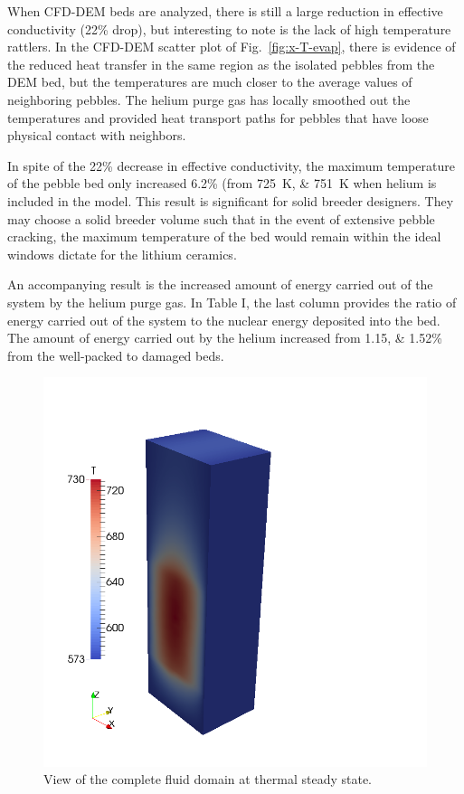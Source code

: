 When CFD-DEM beds are analyzed, there is still a large reduction in effective conductivity (22\% drop), but interesting to note is the lack of high temperature rattlers. In the CFD-DEM scatter plot of Fig.~\ref{fig:x-T-evap}, there is evidence of the reduced heat transfer in the same region as the isolated pebbles from the DEM bed, but the temperatures are much closer to the average values of neighboring pebbles. The helium purge gas has locally smoothed out the temperatures and provided heat transport paths for pebbles that have loose physical contact with neighbors.

In spite of the 22\% decrease in effective conductivity, the maximum temperature of the pebble bed only increased 6.2\% (from \SIlist{725;751}{\kelvin} when helium is included in the model. This result is significant for solid breeder designers. They may choose a solid breeder volume such that in the event of extensive pebble cracking, the maximum temperature of the bed would remain within the ideal windows dictate for the lithium ceramics.

An accompanying result is the increased amount of energy carried out of the system by the helium purge gas. In Table I, the last column provides the ratio of energy carried out of the system to the nuclear energy deposited into the bed. The amount of energy carried out by the helium increased from \numlist{1.15;1.52}\% from the well-packed to damaged beds.

\begin{figure}[t]
    \centering
    \includegraphics[width=\singleimagewidth]{figures/full-cfd-dem-fluid-temp}
    \caption{View of the complete fluid domain at thermal steady state.}\label{fig:cfdem-complete-domain}
\end{figure}


